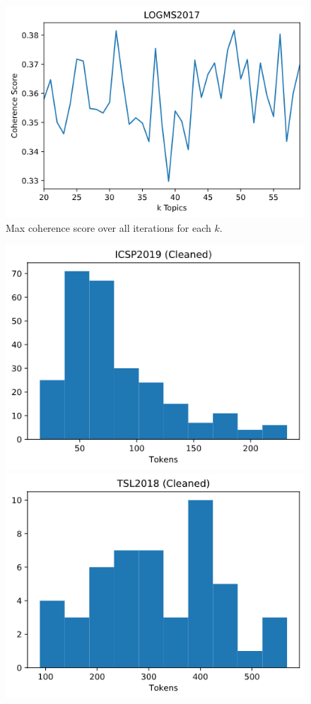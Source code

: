 \documentclass[a4paper, 12pt, twoside]{article}
\numberwithin{equation}{section} %
\begin{document}
{{\begin{appendices}
\begin{figure}[htb]
  \vspace{0.00mm}
  
   \includegraphics[height = 0.24\textheight]{LOGMS_coherence.png}

\caption{Max coherence score over all iterations for each $k$.}
\end{figure}

\begin{figure}[htb]
  \centering
  \includegraphics[width=0.65\linewidth]{ICSP_hist.png}

  \vspace{0.00mm}

  \includegraphics[width=0.65\linewidth]{TSL_hist.png}
  

\end{figure}
\end{appendices}}}
\end{document}
